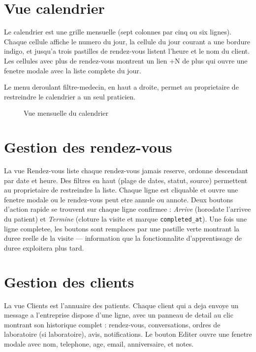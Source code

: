 \section{Vue calendrier}
Le calendrier est une grille mensuelle (sept colonnes par cinq ou six
lignes). Chaque cellule affiche le numero du jour, la cellule du jour
courant a une bordure indigo, et jusqu'a trois pastilles de rendez-vous
listent l'heure et le nom du client. Les cellules avec plus de
rendez-vous montrent un lien \og +N de plus \fg{} qui ouvre une fenetre
modale avec la liste complete du jour.

Le menu deroulant filtre-medecin, en haut a droite, permet au
proprietaire de restreindre le calendrier a un seul praticien.

\begin{figure}[H]
  \centering
  \caption{Vue mensuelle du calendrier}
  \label{fig:calendar}
\end{figure}

\section{Gestion des rendez-vous}
La vue Rendez-vous liste chaque rendez-vous jamais reserve, ordonne
descendant par date et heure. Des filtres en haut (plage de dates,
statut, source) permettent au proprietaire de restreindre la liste.
Chaque ligne est cliquable et ouvre une fenetre modale ou le rendez-vous
peut etre annule ou annote. Deux boutons d'action rapide se trouvent
sur chaque ligne confirmee : \emph{Arrive} (horodate l'arrivee du
patient) et \emph{Termine} (cloture la visite et marque
\texttt{completed\_at}). Une fois une ligne completee, les boutons sont
remplaces par une pastille verte montrant la duree reelle de la visite
--- information que la fonctionnalite d'apprentissage de duree
exploitera plus tard.

\section{Gestion des clients}
La vue Clients est l'annuaire des patients. Chaque client qui a deja
envoye un message a l'entreprise dispose d'une ligne, avec un panneau
de detail au clic montrant son historique complet : rendez-vous,
conversations, ordres de laboratoire (si laboratoire), avis,
notifications. Le bouton Editer ouvre une fenetre modale avec nom,
telephone, age, email, anniversaire, et notes.

